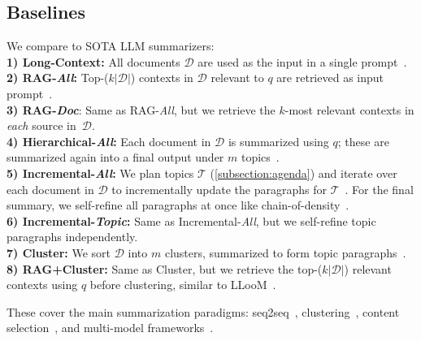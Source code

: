 

\subsection{Baselines} \label{subsection:baselines}

We compare \model to SOTA LLM summarizers:\\
\noindent \textbf{1) Long-Context:} All documents $\mathcal{D}$ are used as the input in a single prompt~\cite{wang2024beyond}. \\
\noindent \textbf{2) RAG-\textit{All}:} Top-($k|\mathcal{D}|$) contexts in $\mathcal{D}$ relevant to $q$ are retrieved as input prompt~\cite{lewis2020retrieval}. \\
\noindent \textbf{3) RAG-\textit{Doc}}: Same as RAG-\textit{All}, but we retrieve the $k$-most relevant contexts in \textit{each} source in~$\mathcal{D}$. \\
\noindent \textbf{4) Hierarchical-\textit{All}:} Each document in $\mathcal{D}$ is summarized using $q$; these are summarized again into a final output under $m$ topics~\cite{chang2024booookscore}. \\
\noindent \textbf{5) Incremental-\textit{All}:} We plan topics $\mathcal{T}$ (\cref{subsection:agenda}) and iterate over each document in $\mathcal{D}$ to incrementally update the paragraphs for $\mathcal{T}$~\cite{chang2024booookscore}. For the final summary, we self-refine all paragraphs at once like chain-of-density~\cite{adams2023sparse}. \\
\noindent \textbf{6) Incremental-\textit{Topic}:} Same as Incremental-\textit{All}, but we self-refine topic paragraphs independently. \\
\noindent \textbf{7) Cluster:} We sort $\mathcal{D}$ into $m$ clusters, summarized to form topic paragraphs~\cite{hayashi-etal-2021-wikiasp}. \\
\noindent \textbf{8) RAG+Cluster:} Same as Cluster, but we retrieve the top-($k|\mathcal{D}|$) relevant contexts using $q$ before clustering, similar to LLooM~\cite{lam2024concept}.

These cover the main summarization paradigms: seq2seq~\cite{sutskever2014sequence}, clustering~\cite{zhang2009automatic}, content selection~\cite{louis2010discourse}, and multi-model frameworks~\cite{chang2024booookscore}.

